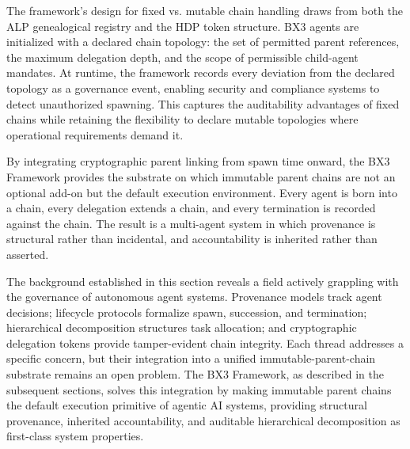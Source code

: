 The framework's design for fixed vs. mutable chain handling draws from both the ALP genealogical registry and the HDP token structure. BX3 agents are initialized with a declared chain topology: the set of permitted parent references, the maximum delegation depth, and the scope of permissible child-agent mandates. At runtime, the framework records every deviation from the declared topology as a governance event, enabling security and compliance systems to detect unauthorized spawning. This captures the auditability advantages of fixed chains while retaining the flexibility to declare mutable topologies where operational requirements demand it.

By integrating cryptographic parent linking from spawn time onward, the BX3 Framework provides the substrate on which immutable parent chains are not an optional add-on but the default execution environment. Every agent is born into a chain, every delegation extends a chain, and every termination is recorded against the chain. The result is a multi-agent system in which provenance is structural rather than incidental, and accountability is inherited rather than asserted.


The background established in this section reveals a field actively grappling with the governance of autonomous agent systems. Provenance models track agent decisions; lifecycle protocols formalize spawn, succession, and termination; hierarchical decomposition structures task allocation; and cryptographic delegation tokens provide tamper-evident chain integrity. Each thread addresses a specific concern, but their integration into a unified immutable-parent-chain substrate remains an open problem. The BX3 Framework, as described in the subsequent sections, solves this integration by making immutable parent chains the default execution primitive of agentic AI systems, providing structural provenance, inherited accountability, and auditable hierarchical decomposition as first-class system properties.
